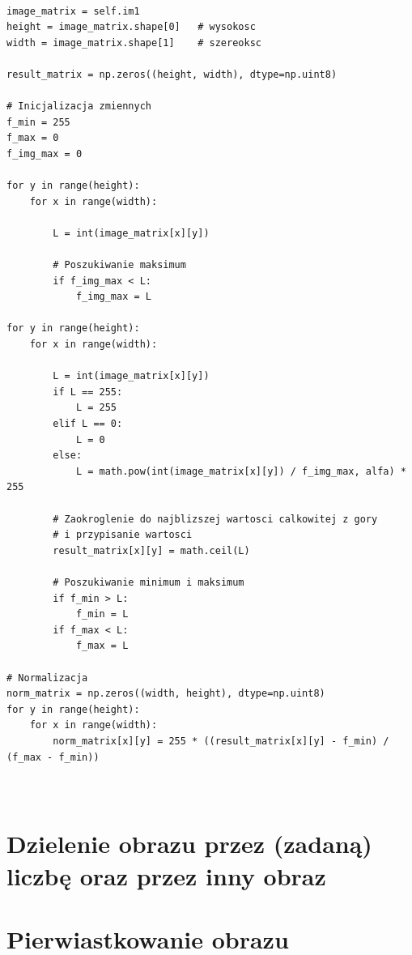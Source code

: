 \documentclass[final,a4paper,openany,12pt]{mwbk}
\begin{document}
\begin{lstlisting}[caption=Potęgowanie obrazu szarego (z zadaną potęgą)]

image_matrix = self.im1
height = image_matrix.shape[0]   # wysokosc
width = image_matrix.shape[1]    # szereoksc

result_matrix = np.zeros((height, width), dtype=np.uint8)

# Inicjalizacja zmiennych
f_min = 255
f_max = 0
f_img_max = 0

for y in range(height):
    for x in range(width):  
        
        L = int(image_matrix[x][y])

        # Poszukiwanie maksimum
        if f_img_max < L:
            f_img_max = L

for y in range(height):
    for x in range(width):  
        
        L = int(image_matrix[x][y])
        if L == 255:
            L = 255
        elif L == 0:
            L = 0
        else:
            L = math.pow(int(image_matrix[x][y]) / f_img_max, alfa) * 255

        # Zaokroglenie do najblizszej wartosci calkowitej z gory
        # i przypisanie wartosci
        result_matrix[x][y] = math.ceil(L)

        # Poszukiwanie minimum i maksimum
        if f_min > L:
            f_min = L
        if f_max < L:
            f_max = L

# Normalizacja
norm_matrix = np.zeros((width, height), dtype=np.uint8)
for y in range(height):
    for x in range(width):
        norm_matrix[x][y] = 255 * ((result_matrix[x][y] - f_min) / (f_max - f_min))
        


\end{lstlisting}

\section {Dzielenie obrazu przez (zadaną) liczbę oraz przez inny obraz}


\section {Pierwiastkowanie obrazu}
\hfill
\\\\
\indent
\end{document}

